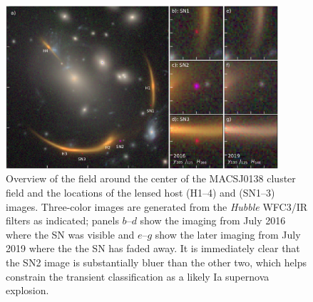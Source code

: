 \documentclass[fleqn,10pt]{wlscirep}
\begin{document}
\begin{figure}
    \centering
    \includegraphics[width=0.9\textwidth]{../Figures/fig1_layout.pdf}
    \caption{Overview of the field around the center of the MACSJ0138 cluster field and the locations of the lensed host (H1--4) and \SNABC (SN1--3) images. 
    Three-color images are generated from the \textit{Hubble} WFC3/IR filters as indicated; panels $b$--$d$ show the imaging from July 2016 where the SN was visible and $e$--$g$ show the later imaging from July 2019 where the the SN has faded away.  It is immediately clear that the SN2 image is substantially bluer than the other two, which helps constrain the transient classification as a likely Ia supernova explosion.}
    \label{fig:layout}
\end{figure}
\end{document}
